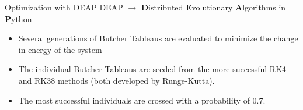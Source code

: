 \documentclass{beamer}
\begin{document}
\begin{frame}{Optimization with DEAP}
    DEAP $\to$ \textbf{D}istributed \textbf{E}volutionary \textbf{A}lgorithms in \textbf{P}ython
    \begin{itemize}
        \item Several generations of Butcher Tableaus are evaluated to minimize
            the \alert{change} in energy of the system
        \item The individual Butcher Tableaus are seeded from the more successful
            RK4 and RK38 methods (both developed by Runge-Kutta).
        \item The most successful individuals are crossed with a probability
            of 0.7.
    \end{itemize}
\end{frame}
\end{document}
